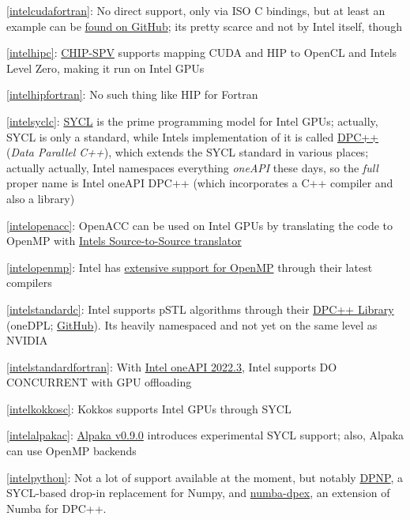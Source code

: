 \item \ref{intelcudafortran}: No direct support, only via ISO C bindings, but at least an example can be \href{https://github.com/codeplaysoftware/SYCL-For-CUDA-Examples/tree/master/examples/fortran_interface}{found on GitHub}; it\textquotesingle s pretty scarce and not by Intel itself, though
\item \ref{intelhipc}: \href{https://github.com/CHIP-SPV/chip-spv}{CHIP-SPV} supports mapping CUDA and HIP to OpenCL and Intel\textquotesingle s Level Zero, making it run on Intel GPUs
\item \ref{intelhipfortran}: No such thing like HIP for Fortran
\item \ref{intelsyclc}: \href{https://www.khronos.org/sycl/}{SYCL} is the prime programming model for Intel GPUs; actually, SYCL is only a standard, while Intel\textquotesingle s implementation of it is called \href{https://www.intel.com/content/www/us/en/developer/tools/oneapi/data-parallel-c-plus-plus.html}{DPC++} (\emph{Data Parallel C++}), which extends the SYCL standard in various places; actually actually, Intel namespaces everything \emph{oneAPI} these days, so the \emph{full} proper name is Intel oneAPI DPC++ (which incorporates a C++ compiler and also a library)
\item \ref{intelopenacc}: OpenACC can be used on Intel GPUs by translating the code to OpenMP with \href{https://github.com/intel/intel-application-migration-tool-for-openacc-to-openmp}{Intel\textquotesingle s Source-to-Source translator}
\item \ref{intelopenmp}: Intel has \href{https://www.intel.com/content/www/us/en/develop/documentation/get-started-with-cpp-fortran-compiler-openmp/top.html}{extensive support for OpenMP} through their latest compilers
\item \ref{intelstandardc}: Intel supports pSTL algorithms through their \href{https://www.intel.com/content/www/us/en/developer/tools/oneapi/dpc-library.html\#gs.fifrh5}{DPC++ Library} (oneDPL; \href{https://github.com/oneapi-src/oneDPL}{GitHub}). It\textquotesingle s heavily namespaced and not yet on the same level as NVIDIA
\item \ref{intelstandardfortran}: With \href{https://www.intel.com/content/www/us/en/developer/articles/release-notes/fortran-compiler-release-notes.html}{Intel oneAPI 2022.3}, Intel supports DO CONCURRENT with GPU offloading
\item \ref{intelkokkosc}: Kokkos supports Intel GPUs through SYCL
\item \ref{intelalpakac}: \href{https://github.com/alpaka-group/alpaka/releases/tag/0.9.0}{Alpaka v0.9.0} introduces experimental SYCL support; also, Alpaka can use OpenMP backends
\item \ref{intelpython}: Not a lot of support available at the moment, but notably \href{https://intelpython.github.io/dpnp/}{DPNP}, a SYCL-based drop-in replacement for Numpy, and \href{https://github.com/IntelPython/numba-dpex}{numba-dpex}, an extension of Numba for DPC++.
